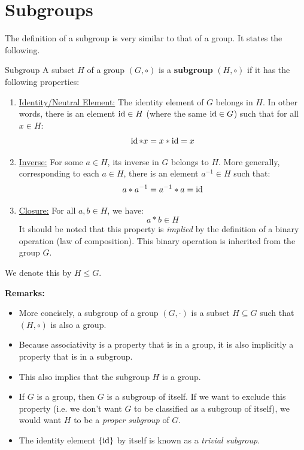 \documentclass[letterpaper]{article}
\begin{document}
\newpage 
\section{Subgroups}
The definition of a subgroup is very similar to that of a group. It states the following. 
\begin{definition}{Subgroup}{}
    A subset $H$ of a group $(G, \circ)$ is a \textbf{subgroup} $(H, \circ)$ if it has the following properties: 
    \begin{enumerate}
        \item \underline{Identity/Neutral Element:} The identity element of $G$ belongs in $H$. In other words, there is an element $\operatorname{id} \in H$ (where the same $\operatorname{id} \in G$) such that for all $x \in H$:
        \[\operatorname{id} * x = x * \operatorname{id} = x\]

        \item \underline{Inverse:} For some $a \in H$, its inverse in $G$ belongs to $H$. More generally, corresponding to each $a \in H$, there is an element $a^{-1} \in H$ such that:
        \[a * a^{-1} = a^{-1} * a = \operatorname{id}\]

        \item \underline{Closure:} For all $a, b \in H$, we have:
        \[a * b \in H\]
        It should be noted that this property is \emph{implied} by the definition of a binary operation (law of composition). This binary operation is inherited from the group $G$.  
    \end{enumerate}
    We denote this by $H \leq G$. 
\end{definition}
\textbf{Remarks:}
\begin{itemize}
    \item More concisely, a subgroup of a group $(G, \cdot)$ is a subset $H \subseteq G$ such that $(H, \circ)$ is also a group.
    \item Because associativity is a property that is in a group, it is also implicitly a property that is in a subgroup. 
    \item This also implies that the subgroup $H$ is a group.
    \item If $G$ is a group, then $G$ is a subgroup of itself. If we want to exclude this property (i.e. we don't want $G$ to be classified as a subgroup of itself), we would want $H$ to be a \emph{proper subgroup} of $G$.
    \item The identity element $\{\operatorname{id}\}$ by itself is known as a \emph{trivial subgroup}. 
\end{itemize}
\end{document}
